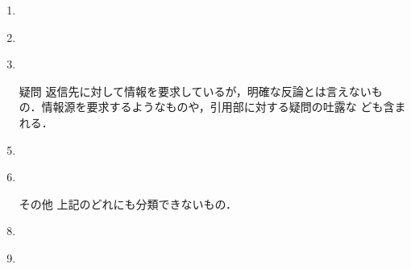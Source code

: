 \documentclass[japanese]{jnlp_1.4}
\newcommand{\addspan}[1]{}
\begin{document}
\begin{description}
\begin{enumerate}
{	$\Rightarrow$ 火災で壊滅した、コスモ
		   石油のコンビナートにあった科学燃料の詳細を記者会見で発
		   表して報道しろ！「危険というのはデマです。」なんて情報
		   で納得するわけないだろ！} \label{ex:counter1}
	     \item \addspan{…東京まで健康被害が現れるようなPuは飛んでこない… RT @YYY: もしプルトニウムが漏れてたら東京から
		   逃げますか？…\\
	$\Rightarrow$（怒）}
		   \label{ex:counter2}
	     \item \addspan{…日本政府は事故の重大性をまったく認識していない。
		   今すぐに多国籍軍を総動員して封じ込めないとチェルノブイ
		   リ以上の被害が出る\\
	$\Rightarrow$ 馬鹿左翼、煽るな。}
		   \label{ex:counter3}
             \item \addspan{…食料がありません。脱水、低血糖が徐々にきています
                   。デマじゃない…見捨てないで下さい【from茨城県鹿島コン
                   ビナート地区】\\
	$\Rightarrow$ せめて公式RTしてください
                   。元の発信者の名前消すとか非公式RTよりひどい。救助を必
                   要としてる人が、誰だかわからなくなると思いませんか？そ
                   のせいで救助が遅れたらと想像できませんか？}
                   \label{ex:counter4}
 \item[疑問] 返信先に対して情報を要求している\addspan{(\ref{ex:question1})}が，明確な反論とは言えないも
	    の．情報源を要求するようなもの\addspan{(\ref{ex:question2})}や，引用部に対する疑問の吐露な
	    ども含まれる．
	     \item \addspan{…コスモ石油の爆発で有害物質の雨が降る件はデマ。
		   広げてしまった方はツイート削除の上、訂正を／コスモ石油
		   が否定… \\
	$\Rightarrow$ JFEケミカル等含めた火災
		   による被害が無いと言うことでよろしいですか？}
		   \label{ex:question1}
	     \item \addspan{…コスモ石油の爆発により有害物質が雲などに付着し、
		   雨などといっしょに降るので…コピペとかして皆さんに知
		   らせてください！！ \\
	$\Rightarrow$ NHK のニュースで
		   は今のところ有毒物質が発生することはないと言っています
		   が、あなたのツイートのソースは何ですか？}
		   \label{ex:question2}
 \item[その他] 上記のどれにも分類できないもの．
	     \item \addspan{千葉県、近隣圏に在住の方に有害物質が雨などと一緒に飛散
		   するという虚偽のチェーンメールが送られています。…\\
	$\Rightarrow$ そうであったとしても、雨カッパとかは持ってた方が良いよね。} \label{ex:other1}
	     \item \addspan{…千葉県、近隣圏に在住の方に有害物質が雨などと一
		   緒に飛散するという虚偽のチェーンメールが \\
		   $\Rightarrow$ 硫黄分の多い原油が燃えると酸性雨につなが
		   る可能性があるので、それに尾ひれはひれがついたものと推
		   測します。} \label{ex:other2}
	    \end{enumerate}
\end{description}
\end{document}
